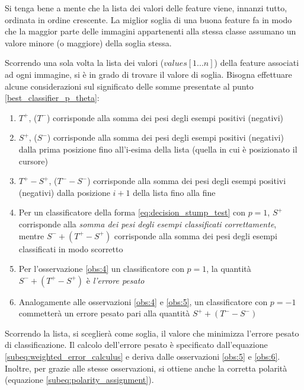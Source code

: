             Si tenga bene a mente che la lista dei valori delle feature viene, innanzi tutto, ordinata in ordine crescente.
            La miglior soglia di una buona feature fa in modo che la maggior parte delle immagini appartenenti alla stessa classe assumano un valore minore (o maggiore) della soglia stessa.

            Scorrendo una sola volta la lista dei valori ($values[1...n]$) della feature associati ad ogni immagine, si è in grado di trovare il valore di soglia.
            Bisogna effettuare alcune considerazioni sul significato delle somme presentate al punto \ref{best_classifier_p_theta}:
            \begin{enumerate}
                \item \label{obs:1} $T^+$, ($T^-$) corrisponde alla somma dei pesi degli esempi positivi (negativi)
                \item \label{obs:2} $S^+$, ($S^-$) corrisponde alla somma dei pesi degli esempi positivi (negativi) dalla prima posizione fino all'i-esima della lista (quella in cui è posizionato il cursore)
                \item \label{obs:3} $T^+ - S^+$, ($T^- - S^-$) corrisponde alla somma dei pesi degli esempi positivi (negativi) dalla posizione $i+1$ della lista fino alla fine
                \item \label{obs:4} Per un classificatore della forma \ref{eq:decision_stump_test} con $p = 1$, $S^+$ corrisponde alla \emph{somma dei pesi degli esempi classificati correttamente}, mentre $S^- + (T^+ - S^+)$ corrisponde alla somma dei pesi degli esempi classificati in modo scorretto
                \item \label{obs:5} Per l'osservazione \ref{obs:4} un classificatore con $p = 1$, la quantità $S^- + (T^+ - S^+)$ è \emph{l'errore pesato}
                \item \label{obs:6} Analogamente alle osservazioni \ref{obs:4} e \ref{obs:5}, un classificatore con $p = -1$ commetterà un errore pesato pari alla quantità $S^+ + (T^- - S^-)$
            \end{enumerate}

            Scorrendo la lista, si sceglierà come soglia, il valore che minimizza l'errore pesato di classificazione.
            Il calcolo dell'errore pesato è specificato dall'equazione \ref{subeq:weighted_error_calculus} e deriva dalle osservazioni \ref{obs:5} e \ref{obs:6}.
            Inoltre, per grazie alle stesse osservazioni, si ottiene anche la corretta polarità (equazione \ref{subeq:polarity_assignment}).

